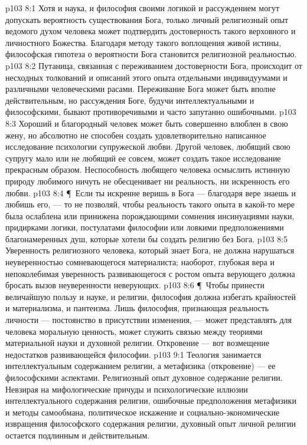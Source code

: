 \vs p103 8:1 Хотя и наука, и философия своими логикой и рассуждением могут допускать вероятность существования Бога, только личный религиозный опыт ведомого духом человека может подтвердить достоверность такого верховного и личностного Божества. Благодаря методу такого воплощения живой истины, философская гипотеза о вероятности Бога становится религиозной реальностью.
\vs p103 8:2 Путаница, связанная с переживанием достоверности Бога, происходит от несходных толкований и описаний этого опыта отдельными индивидуумами и различными человеческими расами. Переживание Бога может быть вполне действительным, но рассуждения  Боге, будучи интеллектуальными и философскими, бывают противоречивыми и часто запутанно ошибочными.
\vs p103 8:3 Хороший и благородный человек может быть совершенно влюблен в свою жену, но абсолютно не способен создать удовлетворительно написанное исследование психологии супружеской любви. Другой человек, любящий свою супругу мало или не любящий ее совсем, может создать такое исследование прекрасным образом. Неспособность любящего человека осмыслить истинную природу любимого ничуть не обесценивает ни реальность, ни искренность его любви.
\vs p103 8:4 \P\ Если ты искренне веришь в Бога --- благодаря вере знаешь и любишь его, --- то не позволяй, чтобы реальность такого опыта в какой\hyp{}то мере была ослаблена или принижена порождающими сомнения инсинуациями науки, придирками логики, постулатами философии или ловкими предположениями благонамеренных душ, которые хотели бы создать религию без Бога.
\vs p103 8:5 Уверенность религиозного человека, который знает Бога, не должна нарушаться неуверенностью сомневающегося материалиста; наоборот, глубокая вера и непоколебимая уверенность развивающегося с ростом опыта верующего должна бросать вызов неуверенности неверующих.
\vs p103 8:6 \P\ Чтобы принести величайшую пользу и науке, и религии, философия должна избегать крайностей и материализма, и пантеизма. Лишь философия, признающая реальность личности --- постоянство в присутствии изменения, --- может представлять для человека моральную ценность, может служить связью между теориями материальной науки и духовной религии. Откровение --- вот возмещение недостатков развивающейся философии.
\vs p103 9:1 Теология занимается интеллектуальным содержанием религии, а метафизика (откровение) --- ее философскими аспектами. Религиозный опыт  духовное содержание религии. Невзирая на мифологические причуды и психологические иллюзии интеллектуального содержания религии, ошибочные предположения метафизики и методы самообмана, политическое искажение и социально\hyp{}экономические извращения философского содержания религии, духовный опыт личной религии остается подлинным и действительным.
